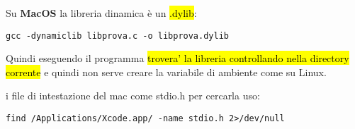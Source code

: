 Su \textbf{MacOS} la libreria dinamica è un \hl{.dylib}:

\begin{lstlisting}
gcc -dynamiclib libprova.c -o libprova.dylib
\end{lstlisting}

Quindi eseguendo il programma \hl{trovera' la libreria controllando nella directory corrente} e quindi non serve creare la variabile di ambiente come su Linux.

i file di intestazione del mac come stdio.h per cercarla uso:

\begin{lstlisting}
find /Applications/Xcode.app/ -name stdio.h 2>/dev/null
\end{lstlisting}



